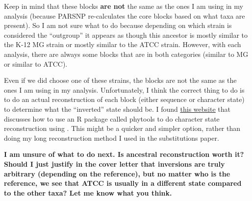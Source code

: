 \documentclass[12pt]{article}
\newcommand{\uhref}[2]{\href{#1}{\underline{#2}}}
\begin{document}
Keep in mind that these blocks \textbf{are not} the same as the ones I am using in my analysis (because PARSNP re-calculates the core blocks based on what taxa are present).
So I am not sure what to do because depending on which strain is considered the ``outgroup'' it appears as though this ancestor is mostly similar to the K-12 MG strain or mostly similar to the ATCC strain.
However, with each analysis, there are always some blocks that are in both categories (similar to MG or similar to ATCC).

Even if we did choose one of these strains, the blocks are not the same as the ones I am using in my analysis. 
Unfortunately, I think the correct thing to do is to do an actual reconstruction of each block (either sequence or character state) to determine what the ``inverted'' state should be.
I found \uhref{http://www.phytools.org/eqg/Exercise_5.2/}{this website} that discusses how to use an R package called phytools to do character state reconstruction using .
This might be a quicker and simpler option, rather than doing my long reconstruction method I used in the substitutions paper.

\textbf{I am unsure of what to do next. Is ancestral reconstruction worth it? Should I just justify in the cover letter that inversions are truly arbitrary (depending on the reference), but no matter who is the reference, we see that ATCC is usually in a different state compared to the other taxa? Let me know what you think.}
%
\end{document}
